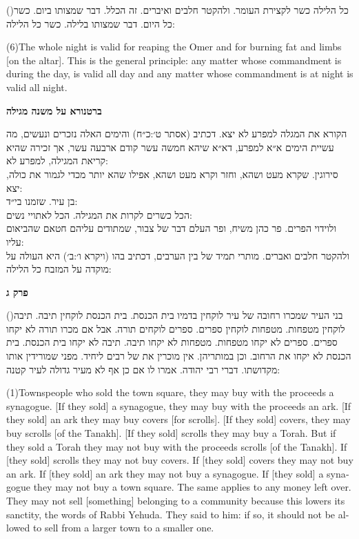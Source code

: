 \documentclass[12pt, openany]{book}
\newcommand{\sethebfont}{
\fontsize{10.5pt}{13.1pt} \selectfont
}
\newcommand{\hebeng}[2]{
	{\sethebfont #1\\}
	
	\begin{english}
		#2
	\end{english}
	\clearpage
}
\newcommand{\chapname}{}
\newcommand{\sectname}{}
\newcommand{\newchap}[1]{
	\addcontentsline{toc}{chapter}{#1}
	\renewcommand{\chapname}{#1}
		\begin{center}
			\textbf{%
\fontsize{16pt}{16pt}\selectfont
				#1}
		\end{center}
}
\newcommand{\newsection}[1]{
	\renewcommand{\sectname}{#1}	
	\vspace{-\baselineskip}
	\begin{center}
		\textbf{%
\fontsize{16pt}{16pt}\selectfont
			#1}
	\end{center}
	\vspace{-\baselineskip}
	\nopagebreak
}
\newcommand{\blockcomment}[2]{ 
\newsection{#1}
\sethebfont	#2}
\newcommand{\vsnum}[1]{(\hebrewnumeral{#1})\space}
\newcommand{\vsnumeng}[1]{(#1)\space}
\begin{document}
\hebeng{\vsnum{6}כל הלילה כשר לקצירת העומר. ולהקטר חלבים ואיברים. זה הכלל. דבר שמצותו ביום. כשר כל היום. דבר שמצותו בלילה. כשר כל הלילה: }{\vsnumeng{6}The whole night is valid for reaping the Omer and for burning fat and limbs {[on the altar]}. This is the general principle: any matter whose commandment is during the day, is valid all day and any matter whose commandment is at night is valid all night.}%

\clearpage
\blockcomment{ברטנורא על משנה מגילה}{הקורא את המגלה למפרע לא יצא. דכתיב (אסתר ט׳:כ״ח) והימים האלה נזכרים ונעשים, מה עשיית הימים א״א למפרע, דא״א שיהא חמשה עשר קודם ארבעה עשר, אך זכירה שהיא קריאת המגילה, למפרע לא:\\סירוגין. שקרא מעט ושהא, וחזר וקרא מעט ושהא, אפילו שהא יותר מכדי לגמור את כולה, יצא:\\בן עיר. שזמנו בי״ד:\\הכל כשרים לקרות את המגילה. הכל לאתויי נשים:\\ולוידוי הפרים. פר כהן משיח, ופר העלם דבר של צבור, שמתודים עליהם חטאם שהביאום עליו:\\ולהקטר חלבים ואברים. מותרי תמיד של בין הערבים, דכתיב בהו (ויקרא ו׳:ב׳) היא העולה על מוקדה על המזבח כל הלילה:\\\n}\clearpage %
\newchap{פרק ג}
\hebeng{\vsnum{1}בני העיר שמכרו רחובה של עיר לוקחין בדמיו בית הכנסת. בית הכנסת לוקחין תיבה. תיבה לוקחין מטפחות. מטפחות לוקחין ספרים. ספרים לוקחים תורה. אבל אם מכרו תורה לא יקחו ספרים. ספרים לא יקחו מטפחות. מטפחות לא יקחו תיבה. תיבה לא יקחו בית הכנסת. בית הכנסת לא יקחו את הרחוב. וכן במותריהן. אין מוכרין את של רבים ליחיד. מפני שמורידין אותו מקדושתו. דברי רבי יהודה. אמרו לו אם כן אף לא מעיר גדולה לעיר קטנה: }{\vsnumeng{1}Townspeople who sold the town square, they may buy with the proceeds a synagogue. {[If they sold]} a synagogue, they may buy with the proceeds an ark. {[If they sold]} an ark they may buy covers {[for scrolls]}. {[If they sold]} covers, they may buy scrolls {[of the Tanakh]}. {[If they sold]} scrolls they may buy a Torah. But if they sold a Torah they may not buy with the proceeds scrolls {[of the Tanakh]}. If {[they sold]} scrolls they may not buy covers. If {[they sold]} covers they may not buy an ark. If {[they sold]} an ark they may not buy a synagogue. If {[they sold]} a synagogue they may not buy a town square. The same applies to any money left over. They may not sell {[something]} belonging to a community because this lowers its sanctity, the words of Rabbi Yehuda. They said to him: if so, it should not be allowed to sell from a larger town to a smaller one.}%
\end{document}
